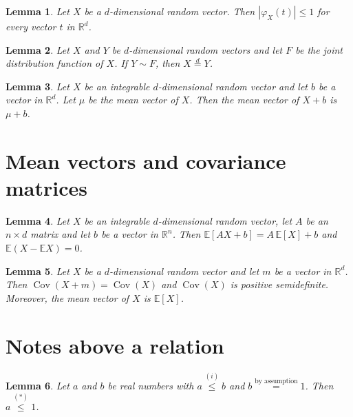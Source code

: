 \documentclass{article}
\newtheorem{lemma}{Lemma}
\begin{document}
\begin{lemma}\label{bounded}
Let $X$ be a $d$-dimensional random vector. Then $|\varphi_X(t)|\le 1$ for every vector $t$ in $\mathbb{R}^d$.
\end{lemma}

\begin{lemma}\label{law}
Let $X$ and $Y$ be $d$-dimensional random vectors and let $F$ be the joint distribution function of $X$. If $Y\sim F$, then $X\stackrel{d}{=}Y$.
\end{lemma}

\begin{lemma}\label{mean-vector}
Let $X$ be an integrable $d$-dimensional random vector and let $b$ be a vector in $\mathbb{R}^d$. Let $\mu$ be the mean vector of $X$. Then the mean vector of $X+b$ is $\mu+b$.
\end{lemma}

\section{Mean vectors and covariance matrices}

\begin{lemma}\label{affine-mean}
Let $X$ be an integrable $d$-dimensional random vector, let $A$ be an $n\times d$ matrix and let $b$ be a vector in $\mathbb{R}^n$. Then $\mathbb{E}[AX+b]=A\,\mathbb{E}[X]+b$ and $\mathbb{E}(X-\mathbb{E}X)=0$.
\end{lemma}

\begin{lemma}\label{covariance}
Let $X$ be a $d$-dimensional random vector and let $m$ be a vector in $\mathbb{R}^d$. Then $\operatorname{Cov}(X+m)=\operatorname{Cov}(X)$ and $\operatorname{Cov}(X)$ is positive semidefinite. Moreover, the mean vector of $X$ is $\mathbb{E}[X]$.
\end{lemma}

\section{Notes above a relation}

\begin{lemma}\label{notes}
Let $a$ and $b$ be real numbers with $a\stackrel{(i)}{\le}b$ and $b\stackrel{\text{by assumption}}{=}1$. Then $a\stackrel{(\ast)}{\le}1$.
\end{lemma}
\end{document}
